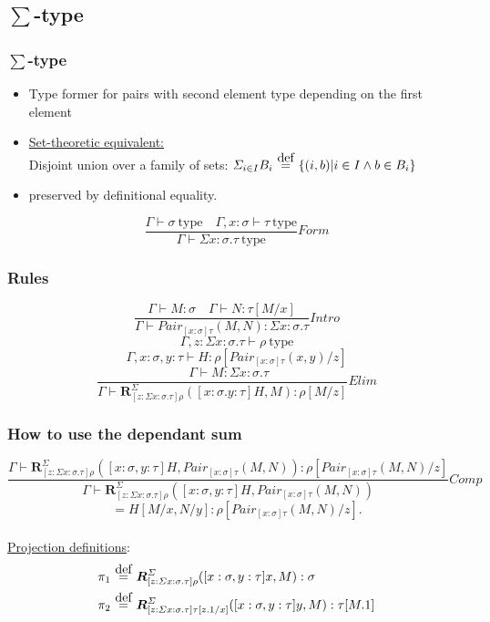 \documentclass[aspectratio=169]{beamer}
\newcommand{\typ}{\ \mathrm{type}}
\newcommand{\pair}[2]{Pair_{[x:\sigma]\tau}(#1, #2)}
\newcommand{\R}[2]{\mathbold{R}_{[z:\Sigma x:\sigma.\tau]\rho}^{\Sigma}(#1, #2)}
\newcommand{\C}{Comp}
\newcommand{\Intro}{Intro}
\newcommand{\F}{Form}
\newcommand{\E}{Elim}
\newcommand\defeq{\stackrel{\mathclap{\normalfont\mbox{def}}}{\ =\ }}
\newcommand{\Gamdash}{\Gamma\vdash}
\begin{document}
    \subsection{$\sum$-type}
    \begin{frame}
        \frametitle{$\sum$-type}
        \begin{itemize}
            \item Type former for pairs with second element type depending on the first element
            \item \underline{Set-theoretic equivalent:}\\
            Disjoint union over a family of sets: $\Sigma_{i\in I}B_i \defeq \{(i,b)|i \in I \wedge b \in B_i\}$
            \item preserved by definitional equality.
        \end{itemize}
        \vspace{40pt}
        $$\frac{\Gamma \vdash \sigma \typ \quad \Gamma,x:\sigma\vdash \tau \typ}{\Gamdash \Sigma x:\sigma.\tau \typ}\F$$
    \end{frame}
    \begin{frame}
        \frametitle{Rules}
        $$\frac{\Gamma \vdash M : \sigma\quad \Gamma \vdash N : \tau[M/x]}{\Gamma \vdash \pair{M}{N} : \Sigma x:\sigma.\tau}\Intro$$
        \vspace{30pt}
        $$\Gamma,z:\Sigma x:\sigma.\tau \vdash \rho \typ$$
        $$\Gamma,x:\sigma,y:\tau\vdash H:\rho [\pair{x}{y}/z]$$
        $$\frac{\quad \Gamma \vdash M : \Sigma x:\sigma.\tau}{\Gamma \vdash \R{[x:\sigma.y:\tau]H}{M}:\rho[M/z]}\E$$
    \end{frame}
    \begin{frame}
        \frametitle{How to use the dependant sum}
        $$\frac{\Gamma \vdash \R{[x:\sigma,y:\tau]H}{\pair{M}{N}}:\rho[\pair{M}{N}/z]}{\Gamma \vdash \R{[x:\sigma,y:\tau]H}{\pair{M}{N}}}\C$$
        $$=H[M/x,N/y]:\rho[\pair{M}{N}/z].$$
        \vspace{5pt}\\
        \underline{Projection definitions}:
        \begin{align*}
            &\pi_1 \defeq \R{[x:\sigma,y:\tau]x}{M}:\sigma\\
            &\pi_2 \defeq \mathbold{R}^\Sigma_{[z:\Sigma x:\sigma.\tau]\tau[z.1/x]}([x:\sigma,y:\tau]y, M):\tau[M.1]\\
        \end{align*}
    \end{frame}
\end{document}
